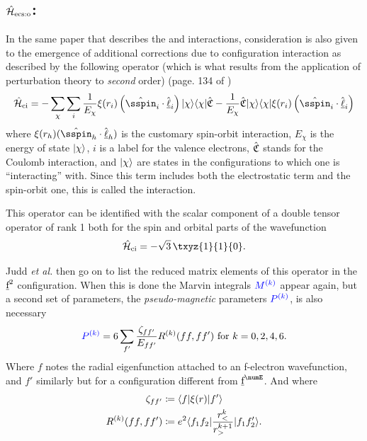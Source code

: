 \documentclass{article}
\begin{document}
\subsection{$\hat{\mathcal{H}}_{\text{ecs:o}}$: \ecso}

    In the same paper \cite{judd_intra-atomic_1968} that describes the \spinspin and \soo interactions, consideration is also given to the emergence of additional corrections due to configuration interaction as described by the following operator (which is what results from the application of perturbation theory to \textit{second} order) (page.  134 of \cite{judd_intra-atomic_1968})
    \begin{equation}
        \ham_{\text{ci}} = -\sum_\chi \sum_i \frac{1}{E_\chi}\xi(r_i) 
            \left(  
                \op{\sspin}_i\cdot\op{\lorb}_i
            \right) \ket{\chi} \bra{\chi} \CoulombNonCentral
            - \frac{1}{E_\chi}\CoulombNonCentral \ket{\chi}\bra{\chi} \xi(r_i) 
                \left( 
                    \op{\sspin}_i\cdot\op{\lorb}_i
                \right) 
    \end{equation} 
    where $\xi(r_h) (\op{\sspin}_h\cdot\op{\lorb}_h)$ is the customary spin-orbit interaction, $E_\chi$ is the energy of state $|\chi\rangle$, $i$ is a label for the valence electrons, $\hat{\mathfrak{C}}$ stands for the Coulomb interaction, and $|\chi\rangle$ are states in the configurations to which one is ``interacting'' with. Since this term includes both the electrostatic term and the spin-orbit one, this is called the \ecso interaction.

    This operator can be identified with the scalar component of a double tensor operator of rank 1 both for the spin and orbital parts of the wavefunction
    \begin{equation}
        \ham_{\text{ci}} = - \sqrt{3}\,\txyz{1}{1}{0}.
    \end{equation}

    Judd \textit{et al.} then go on to list the reduced matrix elements of this operator in the $\underbar{$\text{f}$}^2$ configuration. When this is done the Marvin integrals $\textcolor{blue}{M^{(k)}}$ appear again, but a second set of parameters, the \textit{pseudo-magnetic} parameters $\textcolor{blue}{P^{(k)}}$, is also necessary    
    \begin{equation}
        \textcolor{blue}{P^{(k)}} = 6 \sum_{f'}
            \frac{\zeta_{ff'}}
                {E_{ff'}}
                R^{(k)}(ff,ff') \text{ for }k=0,2,4,6.
    \end{equation}
    Where $f$ notes the radial eigenfunction attached to an f-electron wavefunction, and $f'$ similarly but for a configuration different from $\forb^\numE$. And where
    \begin{align}
        \zeta_{ff'} &\coloneqq \langle f|\xi(r)|f'\rangle \\
        R^{(k)}(ff,ff') &\coloneqq e^2 \langle f_1f_2|\frac{r_<^k}{r_>^{k+1}}|f_1f_2'\rangle.
    \end{align}
\end{document}
